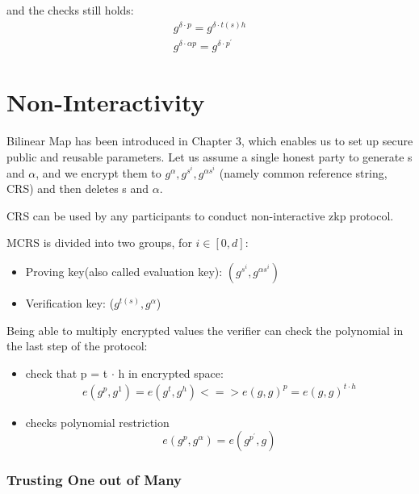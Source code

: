 \documentclass[a4paper,11pt]{article}
\begin{document}
and the checks still holds:
\begin{displaymath}
\begin{split}
g^{\delta \cdot p} = g^{\delta \cdot t(s) h}  \\
g^{\delta \cdot \alpha p} = g^{\delta \cdot p^{'}} 
\end{split}
\end{displaymath}

\section{Non-Interactivity}

Bilinear Map has been introduced in Chapter 3, which enables us to set up secure public and reusable parameters. Let us assume a single honest party to generate s and $\alpha$, and we encrypt them to $g^{\alpha}, g^{s^i}, g^{\alpha s^i}$ (namely common reference string, CRS) and then deletes s and $\alpha$.

CRS can be used by any participants to conduct non-interactive zkp protocol.  

MCRS  is divided into two groups, for $i \in [0, d]$:
\begin{itemize}
\item Proving key(also called evaluation key): $(g^{s^i}, g^{\alpha s^i})$
\item Verification key: ($g^{t(s)}, g^{\alpha}$)
\end{itemize}

Being able to multiply encrypted  values the verifier can check the polynomial in the last step of the protocol:
\begin{itemize}
\item check that p = t $\cdot$ h in encrypted space:
\begin{equation}
\begin{split}
e(g^p, g^1) = e(g^t, g^h)  <=> e(g, g)^p = e(g, g)^{t\cdot h}  
\end{split}
\end{equation}
\item checks polynomial restriction
\begin{equation}
e(g^p, g^{\alpha}) = e(g^{p^{'}}, g)
\end{equation}
\end{itemize}

\subsubsection {Trusting One out of Many}
\end{document}
